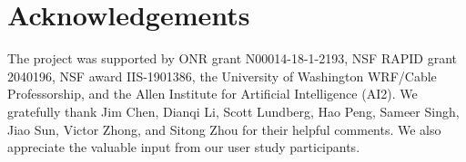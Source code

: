 \section*{Acknowledgements}
The project was supported by ONR grant N00014-18-1-2193, NSF RAPID grant 2040196, NSF award IIS-1901386, the University of Washington WRF/Cable Professorship, and the Allen Institute for Artificial Intelligence (AI2).
We gratefully thank 
Jim Chen, 
Dianqi Li,
Scott Lundberg, 
Hao Peng, 
Sameer Singh,
Jiao Sun,
Victor Zhong,
and Sitong Zhou for their helpful comments.
We also appreciate the valuable input from our user study participants.
